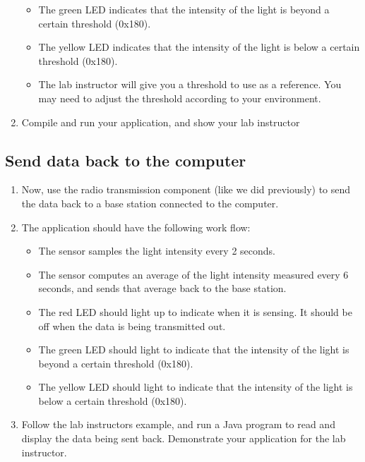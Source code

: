 \documentclass[letterpaper,12pt]{article}
\begin{document}
\begin{enumerate}
\begin{itemize}
            \item The green LED indicates that the intensity of the light
                  is beyond a certain threshold (0x180).
            \item The yellow LED indicates that the intensity of the light is
                  below a certain threshold (0x180).
            \item The lab instructor will give you a threshold to use as a
                  reference. You may need to adjust the threshold according
                  to your environment.
          \end{itemize}
    \item Compile and run your application, and show your lab instructor
\end{enumerate}
\subsection*{Send data back to the computer}
\begin{enumerate}
    \item Now, use the radio transmission component (like we did previously) to
          send the data back to a base station connected to the computer.
    \item The application should have the following work flow:
        \begin{itemize}
            \item The sensor samples the light intensity every 2 seconds.
            \item The sensor computes an average of the light intensity
                  measured every 6 seconds, and sends that average back
                  to the base station.
            \item The red LED should light up to indicate when it is sensing.
                  It should be off when the data is being transmitted out.
            \item The green LED should light to indicate that the intensity of
                  the light is beyond a certain threshold (0x180).
            \item The yellow LED should light to indicate that the intensity
                  of the light is below a certain threshold (0x180).
        \end{itemize}
    \item Follow the lab instructors example, and run a Java program to read
          and display the data being sent back. Demonstrate your application for
          the lab instructor.
\end{enumerate}
\end{document}
